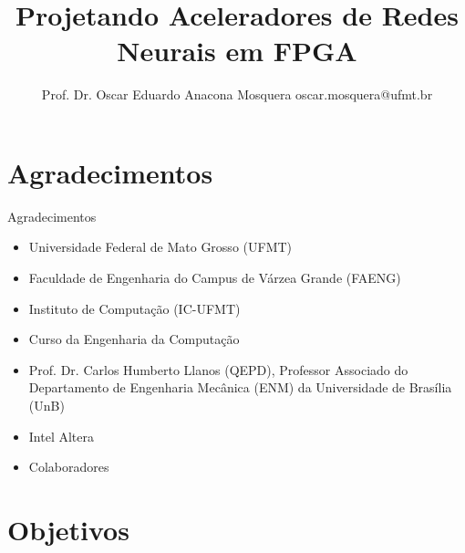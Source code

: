 \documentclass[aspectratio=169]{beamer}
\title[Aceleradores de Redes Neurais em FPGA]{Projetando Aceleradores de Redes Neurais em FPGA} %
\author[Prof. Dr. Oscar Eduardo Anacona Mosquera]{Prof. Dr. Oscar Eduardo Anacona Mosquera \newline\newline 
\scriptsize{oscar.mosquera@ufmt.br}
}%
\begin{document}
\begin{frame}[plain]
\titlepage

\end{frame}


\section{Agradecimentos}



\begin{frame}{Agradecimentos}
	
	\begin{itemize}
		\item Universidade Federal de Mato Grosso (UFMT)
		\item Faculdade de Engenharia do Campus de Várzea Grande (FAENG)
		\item Instituto de Computação (IC-UFMT)
		\item Curso da Engenharia da Computação
		\item Prof. Dr. Carlos Humberto Llanos (QEPD), Professor Associado do Departamento de Engenharia Mecânica (ENM) da Universidade de Brasília (UnB)
		\item  Intel Altera
		\item  Colaboradores
	\end{itemize}	
	
\end{frame}
\section{Objetivos}
\end{document}
